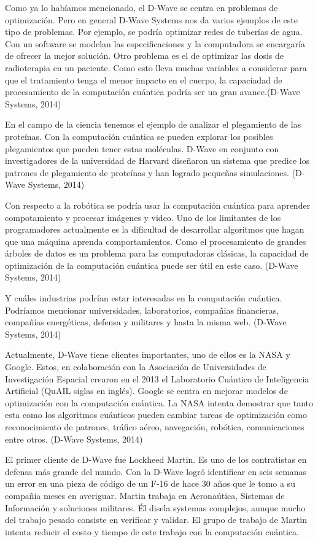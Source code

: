 \documentclass[11pt,a4paper]{article}
\begin{document}
Como ya lo habíamos mencionado, el D-Wave se centra en problemas de optimización. Pero en general D-Wave Systems nos da varios ejemplos de este tipo de problemas. Por ejemplo, se podría optimizar redes de tuberías de agua. Con un software se modelan las especificaciones y la computadora se encargaría de ofrecer la mejor solución. Otro problema es el de optimizar las dosis de radioterapia en un paciente. Como esto lleva muchas variables a considerar para que el tratamiento tenga el menor impacto en el cuerpo, la capaciadad de procesamiento de la computación cuántica podría ser un gran avance.(D-Wave Systems, 2014)

En el campo de la ciencia tenemos el ejemplo de analizar el plegamiento de las proteínas. Con la computación cuántica se pueden explorar los posibles plegamientos que pueden tener estas moléculas. D-Wave en conjunto con investigadores de la universidad de Harvard diseñaron un sistema que predice los patrones de plegamiento de proteínas y han logrado pequeñas simulaciones. (D-Wave Systems, 2014)

Con respecto a la robótica se podría usar la computación cuántica para aprender compotamiento y procesar imágenes y video. Uno de los limitantes de los programadores actualmente es la dificultad de desarrollar algoritmos que hagan que una máquina aprenda comportamientos. Como el procesamiento de grandes árboles de datos es un problema para las computadoras clásicas, la capacidad de optimización de la computación cuántica puede ser útil en este caso. (D-Wave Systems, 2014)

Y cuáles industrias podrían estar interesadas en la computación cuántica. Podríamos mencionar universidades, laboratorios, compañias financieras, compañías energéticas, defensa y militares y hasta la misma web. (D-Wave Systems, 2014)

Actualmente, D-Wave tiene clientes importantes, uno de ellos es la NASA y Google. Estos, en colaboración con la Asociación de Universidades de Investigación Espacial crearon en el 2013 el Laboratorio Cuántico de Inteligencia Artificial (QuAIL siglas en inglés). Google se centra en mejorar modelos de optimización con la computación cuántica. La NASA intenta demostrar que tanto esta como los algoritmos cuánticos pueden cambiar tareas de optimización como reconocimiento de patrones, tráfico aéreo, navegación, robótica, comunicaciones entre otros. (D-Wave Systems, 2014)

El primer cliente de D-Wave fue Lockheed Martin. Es uno de los contratistas en defensa más grande del mundo. Con la D-Wave logró identificar en seis semanas un error en una pieza de código de un F-16 de hace 30 años que le tomo a su compañia meses en averiguar. Martin trabaja en Aeronaútica, Sistemas de Información y soluciones militares. Él disela systemas complejos, aunque mucho del trabajo pesado consiste en verificar y validar. El grupo de trabajo de Martin intenta reducir el costo y tiempo de este trabajo con la computación cuántica.
\end{document}
